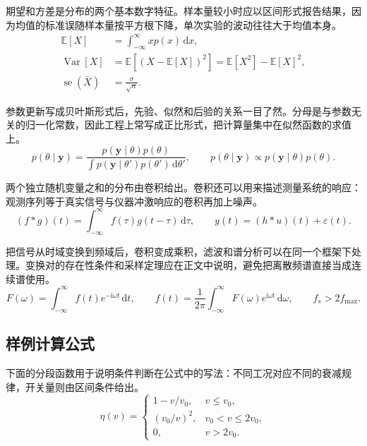 期望和方差是分布的两个基本数字特征。样本量较小时应以区间形式报告结果，因为均值的标准误随样本量按平方根下降，单次实验的波动往往大于均值本身。
\begin{equation}
  \begin{aligned}
    \mathbb{E}[X] &=
      \int_{-\infty}^{\infty}xp(x)\,\mathrm{d}x,\\
    \operatorname{Var}[X] &=
      \mathbb{E}\!\left[(X-\mathbb{E}[X])^2\right]
      =\mathbb{E}[X^2]-\mathbb{E}[X]^2,\\
    \operatorname{se}(\bar{X}) &= \frac{\sigma}{\sqrt{n}}.
  \end{aligned}
  \label{eq:moments}
\end{equation}

参数更新写成贝叶斯形式后，先验、似然和后验的关系一目了然。分母是与参数无关的归一化常数，因此工程上常写成正比形式，把计算量集中在似然函数的求值上。
\begin{equation}
  p(\theta\mid\bm{y})=
  \frac{p(\bm{y}\mid\theta)p(\theta)}
  {\int p(\bm{y}\mid\theta')p(\theta')\,\mathrm{d}\theta'},\qquad
  p(\theta\mid\bm{y})\propto p(\bm{y}\mid\theta)p(\theta).
  \label{eq:bayes}
\end{equation}

两个独立随机变量之和的分布由卷积给出。卷积还可以用来描述测量系统的响应：观测序列等于真实信号与仪器冲激响应的卷积再加上噪声。
\begin{equation}
  (f*g)(t)=\int_{-\infty}^{\infty}f(\tau)g(t-\tau)\,\mathrm{d}\tau,\qquad
  y(t)=(h*u)(t)+\varepsilon(t).
  \label{eq:convolution}
\end{equation}

把信号从时域变换到频域后，卷积变成乘积，滤波和谱分析可以在同一个框架下处理。变换对的存在性条件和采样定理应在正文中说明，避免把离散频谱直接当成连续谱使用。
\begin{equation}
  F(\omega)=\int_{-\infty}^{\infty}f(t)e^{-\mathrm{i}\omega t}\,\mathrm{d}t,\qquad
  f(t)=\frac{1}{2\pi}\int_{-\infty}^{\infty}
  F(\omega)e^{\mathrm{i}\omega t}\,\mathrm{d}\omega,\qquad
  f_s>2f_{\max}.
  \label{eq:fourier}
\end{equation}

\subsection{样例计算公式}

下面的分段函数用于说明条件判断在公式中的写法：不同工况对应不同的衰减规律，开关量则由区间条件给出。
\begin{equation}
  \eta(v)=
  \begin{cases}
    1-v/v_0, & v\leq v_0,\\
    (v_0/v)^2, & v_0<v\leq2v_0,\\
    0, & v>2v_0.
  \end{cases}
  \label{eq:piecewise}
\end{equation}


